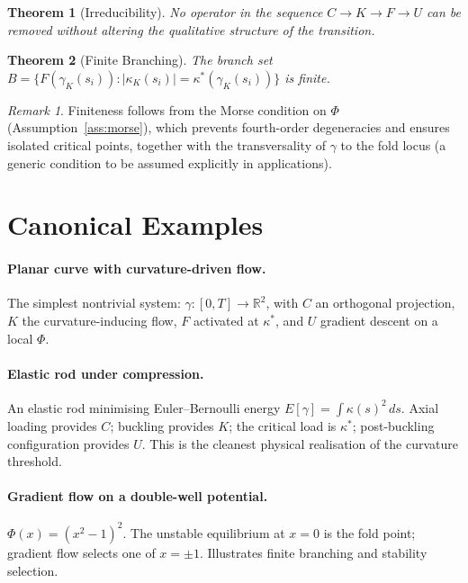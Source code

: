\documentclass[12pt, oneside]{book}
\theoremstyle{plain}
\newtheorem{theorem}{Theorem}[section]
\theoremstyle{definition}
\theoremstyle{remark}
\newtheorem{remark}{Remark}[section]
\begin{document}
\begin{theorem}[Irreducibility]
No operator in the sequence $C \to K \to F \to U$ can be removed
without altering the qualitative structure of the transition.
\end{theorem}

\begin{theorem}[Finite Branching]
The branch set $B = \{F(\gamma_K(s_i)) :
|\kappa_K(s_i)| = \kappa^*(\gamma_K(s_i))\}$ is finite.
\end{theorem}

\begin{remark}
Finiteness follows from the Morse condition on $\Phi$
(Assumption~\ref{ass:morse}), which prevents fourth-order degeneracies
and ensures isolated critical points, together with the transversality
of $\gamma$ to the fold locus (a generic condition to be assumed
explicitly in applications).
\end{remark}

\section{Canonical Examples}

\paragraph{Planar curve with curvature-driven flow.}
The simplest nontrivial system: $\gamma : [0,T] \to \mathbb{R}^2$,
with $C$ an orthogonal projection, $K$ the curvature-inducing flow,
$F$ activated at $\kappa^*$, and $U$ gradient descent on a local
$\Phi$.

\paragraph{Elastic rod under compression.}
An elastic rod minimising Euler--Bernoulli energy
$E[\gamma] = \int \kappa(s)^2\,ds$. Axial loading provides $C$;
buckling provides $K$; the critical load is $\kappa^*$; post-buckling
configuration provides $U$. This is the cleanest physical realisation
of the curvature threshold.

\paragraph{Gradient flow on a double-well potential.}
$\Phi(x) = (x^2 - 1)^2$. The unstable equilibrium at $x = 0$ is the
fold point; gradient flow selects one of $x = \pm 1$. Illustrates
finite branching and stability selection.
\end{document}
